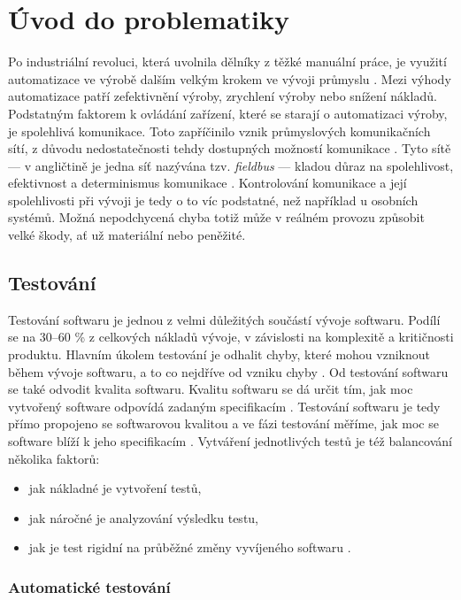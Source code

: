 \chapter{Úvod do problematiky} %


Po industriální revoluci, která uvolnila dělníky z těžké manuální práce, je využití automatizace ve výrobě dalším velkým krokem ve vývoji průmyslu \cite{roots_of_automation}. 
Mezi výhody automatizace patří zefektivnění výroby, zrychlení výroby nebo snížení nákladů. Podstatným faktorem k ovládání zařízení, které se starají o automatizaci výroby, je spolehlivá komunikace. Toto zapříčinilo vznik průmyslových komunikačních sítí, z důvodu nedostatečnosti tehdy dostupných možností komunikace \cite{evolution_of_factory_automation}.
Tyto sítě --- v angličtině je jedna síť nazývána tzv. \textit{fieldbus} --- kladou důraz na spolehlivost, efektivnost a determinismus komunikace \cite{future_of_ind_com}. Kontrolování komunikace a její spolehlivosti při vývoji je tedy o to víc podstatné, než například u osobních systémů. Možná nepodchycená chyba totiž může v reálném provozu způsobit velké škody, ať už materiální nebo peněžité.


\section{Testování}


Testování softwaru je jednou z velmi důležitých součástí vývoje softwaru. Podílí se na 30--60 \% z celkových nákladů vývoje, v závislosti na komplexitě a kritičnosti produktu.
Hlavním úkolem testování je odhalit chyby, které mohou vzniknout během vývoje softwaru, a to co nejdříve od vzniku chyby \cite{test_automation}. Od testování softwaru se také odvodit kvalita softwaru. Kvalitu softwaru se dá určit tím, jak moc vytvořený software odpovídá zadaným specifikacím \cite{software_quality}. Testování softwaru je tedy přímo propojeno se softwarovou kvalitou a ve fázi testování měříme, jak moc se software blíží k jeho specifikacím \cite{KUMAR20168}. Vytváření jednotlivých testů je též balancování několika faktorů:
\begin{itemize}
    \item jak nákladné je vytvoření testů,
    \item jak náročné je analyzování výsledku testu,
    \item jak je test rigidní na průběžné změny vyvíjeného softwaru \cite{fewster1999software}.
\end{itemize}


\subsection{Automatické testování}


